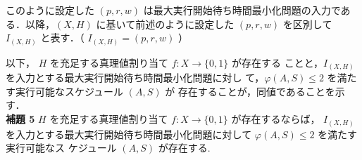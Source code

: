 \documentclass[12pt]{optlab-bachelor}
\begin{document}
  このように設定した $(p,r,w)$ は最大実行開始待ち時間最小化問題の入力である．以降，$(X,H)$ に基いて前述のように設定した $(p,r,w)$ を区別して $I_{(X,H)}$ と表す．（ $I_{(X,H)} = (p,r,w)$ ）

  以下， $H$ を充足する真理値割り当て $f : X \to \{0,1\}$ が存在する
  ことと，$I_{(X,H)}$ を入力とする最大実行開始待ち時間最小化問題に対し
  て，$\varphi(A,S) \le 2$ を満たす実行可能なスケジュール $(A,S)$ が
  存在することが，同値であることを示す．\\

  \noindent \textbf{補題 5}
  $H$ を充足する真理値割り当て $f : X \to \{0,1\}$ が存在するならば，
  $I_{(X,H)}$ を入力とする最大実行開始待ち時間最小化問題に対して
  $\varphi(A, S) \le 2$ を満たす実行可能なス
  ケジュール $(A, S)$ が存在する.\\
\end{document}
